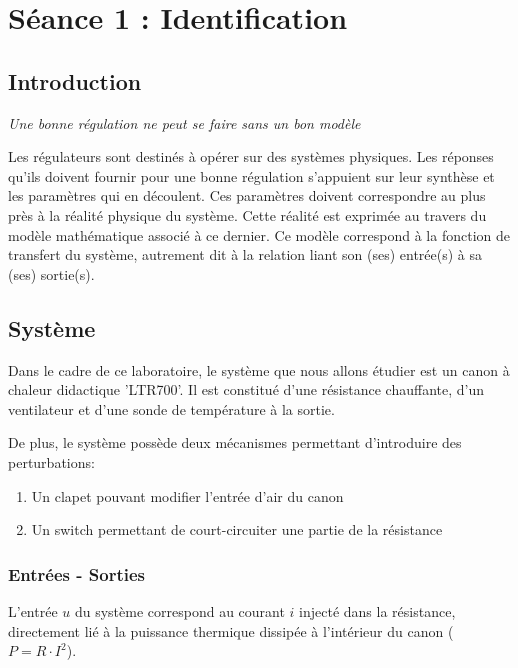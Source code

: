 \section{Séance 1 : Identification}
\subsection{Introduction}
\begin{center}
\textit{Une bonne régulation ne peut se faire sans un bon modèle}
\end{center}

Les régulateurs sont destinés à opérer sur des systèmes physiques. 
Les réponses qu'ils doivent fournir pour une bonne régulation s'appuient sur 
leur synthèse et les paramètres qui en découlent. 
Ces paramètres doivent correspondre au plus près à la réalité physique du système. 
Cette réalité est exprimée au travers du modèle mathématique associé à ce dernier. 
Ce modèle correspond à la fonction de transfert du système, 
autrement dit à la relation liant son (ses) entrée(s) à sa (ses) sortie(s).\\

\subsection{Système}
Dans le cadre de ce laboratoire, le système que nous allons étudier est un 
canon à chaleur didactique 'LTR700'. Il est constitué d'une résistance chauffante, 
d'un ventilateur et d'une sonde de température à la sortie.

De plus, le système possède deux mécanismes permettant d'introduire des perturbations:
\begin{enumerate}
    \item Un clapet pouvant modifier l'entrée d'air du canon
    \item Un switch permettant de court-circuiter une partie de la résistance
\end{enumerate}




\subsubsection{Entrées - Sorties}
L'entrée $u$ du système correspond au courant $i$ injecté dans la résistance, 
directement lié à la puissance thermique dissipée à l'intérieur du canon ($P = R \cdot I^{2}$).\\
 
